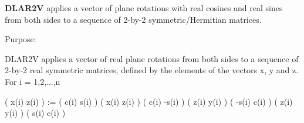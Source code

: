 {\bfseries D\+L\+A\+R2\+V} applies a vector of plane rotations with real cosines and real sines from both sides to a sequence of 2-\/by-\/2 symmetric/\+Hermitian matrices. 

 \begin{DoxyParagraph}{Purpose\+: }
\begin{DoxyVerb} DLAR2V applies a vector of real plane rotations from both sides to
 a sequence of 2-by-2 real symmetric matrices, defined by the elements
 of the vectors x, y and z. For i = 1,2,...,n

    ( x(i)  z(i) ) := (  c(i)  s(i) ) ( x(i)  z(i) ) ( c(i) -s(i) )
    ( z(i)  y(i) )    ( -s(i)  c(i) ) ( z(i)  y(i) ) ( s(i)  c(i) )\end{DoxyVerb}
 
\end{DoxyParagraph}

